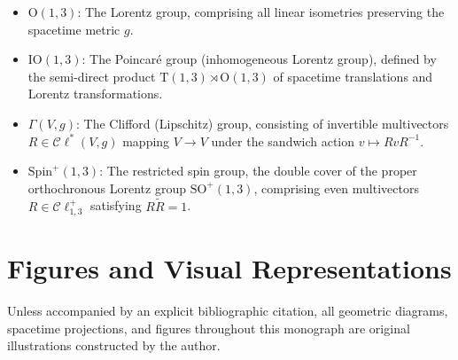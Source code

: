 \begin{itemize}
  \item $\mathrm{O}(1,3)$: The Lorentz group, comprising all linear isometries
    preserving the spacetime metric $g$.
  \item $\mathrm{IO}(1,3)$: The Poincaré group (inhomogeneous Lorentz group),
    defined by the semi-direct product $\mathrm{T}(1,3) \rtimes \mathrm{O}(1,3)$
    of spacetime translations and Lorentz transformations.
  \item $\Gamma(V, g)$: The Clifford (Lipschitz) group, consisting of
    invertible multivectors $R \in \mathcal{C}\ell^*(V, g)$ mapping $V \to V$
    under the sandwich action $v \mapsto R v R^{-1}$.
  \item $\mathrm{Spin}^+(1,3)$: The restricted spin group, the double cover of
    the proper orthochronous Lorentz group $\mathrm{SO}^+(1,3)$, comprising
    even multivectors $R \in \mathcal{C}\ell^+_{1,3}$ satisfying $R\tilde{R} =
    1$.
\end{itemize}

\section*{Figures and Visual Representations}
Unless accompanied by an explicit bibliographic citation, all geometric
diagrams, spacetime projections, and figures throughout this monograph
are original illustrations constructed by the author.
